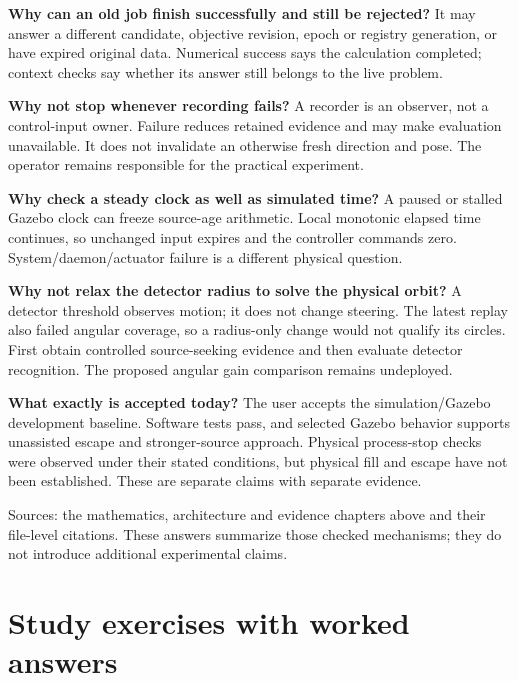 \documentclass[
  10pt,
  letterpaper,
]{article}
\begin{document}
\textbf{Why can an old job finish successfully and still be rejected?}
It may answer a different candidate, objective revision, epoch or
registry generation, or have expired original data. Numerical success
says the calculation completed; context checks say whether its answer
still belongs to the live problem.

\textbf{Why not stop whenever recording fails?} A recorder is an
observer, not a control-input owner. Failure reduces retained evidence
and may make evaluation unavailable. It does not invalidate an otherwise
fresh direction and pose. The operator remains responsible for the
practical experiment.

\textbf{Why check a steady clock as well as simulated time?} A paused or
stalled Gazebo clock can freeze source-age arithmetic. Local monotonic
elapsed time continues, so unchanged input expires and the controller
commands zero. System/daemon/actuator failure is a different physical
question.

\textbf{Why not relax the detector radius to solve the physical orbit?}
A detector threshold observes motion; it does not change steering. The
latest replay also failed angular coverage, so a radius-only change
would not qualify its circles. First obtain controlled source-seeking
evidence and then evaluate detector recognition. The proposed angular
gain comparison remains undeployed.

\textbf{What exactly is accepted today?} The user accepts the
simulation/Gazebo development baseline. Software tests pass, and
selected Gazebo behavior supports unassisted escape and stronger-source
approach. Physical process-stop checks were observed under their stated
conditions, but physical fill and escape have not been established.
These are separate claims with separate evidence.

Sources: the mathematics, architecture and evidence chapters above and
their file-level citations. These answers summarize those checked
mechanisms; they do not introduce additional experimental claims.

\section{Study exercises with worked
answers}\label{study-exercises-with-worked-answers}
\end{document}
